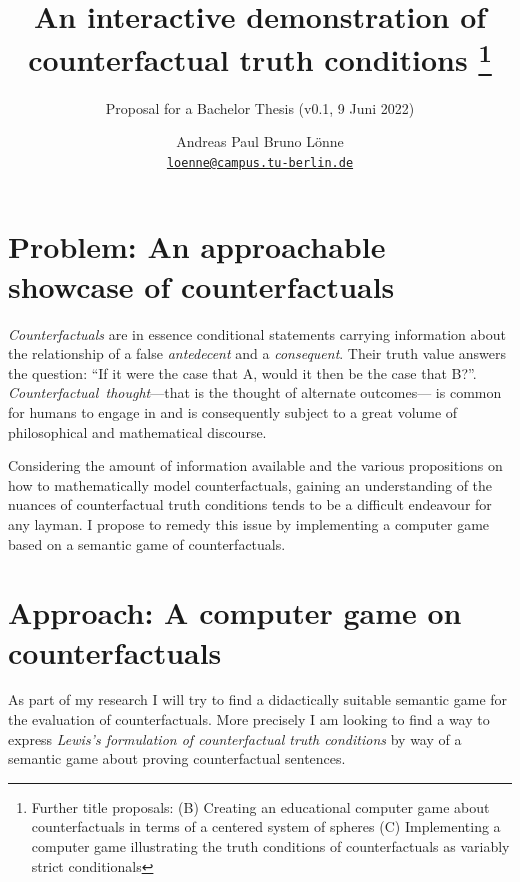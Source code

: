 \documentclass[a4paper,american]{paper}
\providecommand*{\code}[1]{\texttt{#1}}
\begin{document}
\title{An interactive demonstration of counterfactual truth conditions%
	\footnote{Further title proposals:
		(B) Creating an educational computer game about counterfactuals in terms of a centered system of spheres
		(C) Implementing a computer game illustrating the truth conditions of counterfactuals as variably strict conditionals
	}
}

\subtitle{Proposal for a Bachelor Thesis (v0.1, 9 Juni 2022)}

\author{%
	Andreas Paul Bruno Lönne\\
	\code{\href{mailto:loenne@campus.tu-berlin.de}{loenne@campus.tu-berlin.de}}
}


\maketitle

\section*{Problem: An approachable showcase of counterfactuals}
{\it Counterfactuals} are in essence conditional statements carrying information about the relationship of a false {\it antedecent} and a {\it consequent}. Their truth value answers the question: ``If it were the case that A, would it then be the case that B?''. {\it Counterfactual~thought}---that is the thought of alternate outcomes---\cite{byrne_counterfactual_thought_2016} is common for humans to engage in and is consequently subject to a great volume of philosophical and mathematical discourse. 

Considering the amount of information available and the various propositions on how to mathematically model counterfactuals, gaining an understanding of the nuances of counterfactual truth conditions tends to be a difficult endeavour for any layman. I propose to remedy this issue by implementing a computer game based on a semantic game of counterfactuals.

\section*{Approach: A computer game on counterfactuals}
As part of my research I will try to find a didactically suitable semantic game for the evaluation of counterfactuals. More precisely I am looking to find a way to express {\it Lewis's formulation of counterfactual truth conditions} \cite{lewis_counterfactuals_1973} by way of a semantic game about proving counterfactual sentences.
\end{document}
